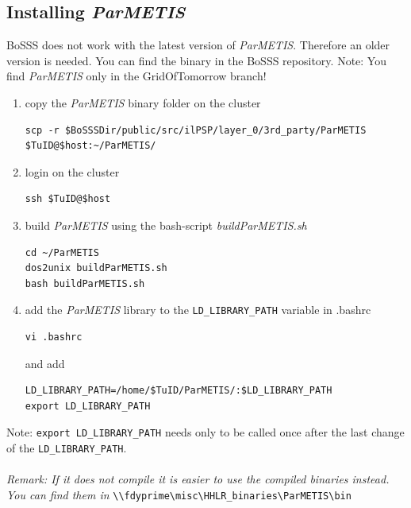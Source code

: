 \documentclass[11pt,twoside,a4paper]{fdyartcl}
\begin{document}
\subsection{Installing \emph{ParMETIS}}
BoSSS does not work with the latest version of \emph{ParMETIS}. Therefore an older version is needed. You can find the binary in the BoSSS repository. Note: You find \emph{ParMETIS} only in the GridOfTomorrow branch!
\begin{enumerate}
\item copy the \emph{ParMETIS} binary folder on the cluster
\begin{verbatim}
scp -r $BoSSSDir/public/src/ilPSP/layer_0/3rd_party/ParMETIS $TuID@$host:~/ParMETIS/
\end{verbatim}
\item login on the cluster
\begin{verbatim}
ssh $TuID@$host
\end{verbatim}
\item build \emph{ParMETIS} using the bash-script \emph{buildParMETIS.sh}
\begin{verbatim}
cd ~/ParMETIS
dos2unix buildParMETIS.sh
bash buildParMETIS.sh
\end{verbatim}
\item  add the \emph{ParMETIS} library to the \verb|LD_LIBRARY_PATH| variable in .bashrc
\begin{verbatim}
vi .bashrc
\end{verbatim}
and add
\begin{verbatim}
LD_LIBRARY_PATH=/home/$TuID/ParMETIS/:$LD_LIBRARY_PATH
export LD_LIBRARY_PATH
\end{verbatim}
\end{enumerate}
Note: \verb|export LD_LIBRARY_PATH| needs only to be called once after the last change of the \verb|LD_LIBRARY_PATH|.\\\\
\textit{Remark: If it does not compile it is easier to use the compiled binaries instead. You can find them in} \verb|\\fdyprime\misc\HHLR_binaries\ParMETIS\bin|
\end{document}
